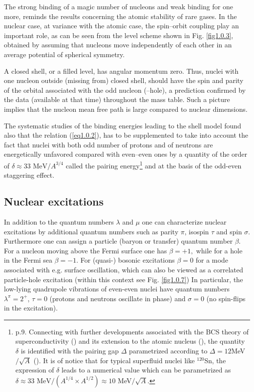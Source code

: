 The strong binding of a magic number of nucleons and weak binding for one more, reminds the results  concerning the atomic stability of rare gases. In the nuclear case, at variance with the atomic case, the spin--orbit coupling play an important role, as can be seen from the level scheme shown in Fig. \ref{fig1.0.3}, obtained by assuming that nucleons move independently of each other in an average potential  of  spherical symmetry.


A closed shell, or a filled level, has angular momentum zero. Thus, nuclei with one nucleon outside (missing from) closed shell, should have the spin and parity of the orbital associated with the odd nucleon (--hole), a prediction confirmed by the data (available at that time) throughout the mass table. Such a picture implies that the nucleon mean free path is large compared to nuclear dimensions.


The systematic studies of the binding energies leading to the shell model found also that the relation (\ref{eq1.0.2}), has to be supplemented to take into account the fact that nuclei with both odd number of protons and of neutrons are energetically unfavored compared with even--even ones by a quantity of the order of $\delta\approx33\text{ MeV}/A^{3/4}$ called the pairing energy\footnote{\label{foot2} \cite{Mayer:55} p.9. Connecting with further developments associated with the BCS theory of superconductivity (\cite{Bardeen:57a,Bardeen:57b}) and its extension to the atomic nucleus (\cite{Bohr:58}), the quantity $\delta$ is identified with the pairing gap $\Delta$ parametrized according to $\Delta=12 $MeV$/\sqrt{A}$ (\cite{Bohr:69}). It is of notice that for typical superfluid nuclei like $^{120}$Sn, the expression of $\delta$ leads to a numerical value which can be parametrized as  $\delta\approx33\text{ MeV}/(A^{1/4}\times A^{1/2})\approx10$ MeV$/\sqrt{A}$.} and at the basis of the odd-even staggering effect.

\subsection{Nuclear excitations}\label{S1.1.2}
In addition to the quantum numbers $\lambda$ and $\mu$ one can characterize nuclear excitations by additional quantum numbers such as parity $\pi$, isospin $\tau$ and spin $\sigma$. Furthermore one can assign a particle (baryon or transfer) quantum number $\beta$. For a nucleon moving above the Fermi surface one has $\beta=+1,$ while for a hole in the Fermi sea $\beta=-1$. For (quasi-) bosonic excitations $\beta=0$ for a mode associated with e.g. surface oscillation, which can also be viewed as a correlated particle-hole excitation (within this context see Fig. \ref{fig1.0.7}) In particular, the low-lying quadrupole vibrations of even-even nuclei have quantum numbers $\lambda^\pi=2^+$, $\tau=0$ (protons and neutrons oscillate in phase) and $\sigma=0$ (no spin-flips in the excitation).

